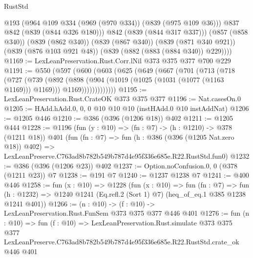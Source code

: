 \begin{lexlean}{RustStd}
\begin{coremodule}
            @193
            (@964 @109 @334 (@969 (@970 @334)) (@839 (@975 @109 @36)))
            @837
            @842
            (@839 (@844 @326 @180)))
          @842
          (@839 (@844 @317 @337)))
        (@857 (@858 @340))
        (@839 (@862 @340))
        (@839 (@867 @340))
        (@839 (@871 @340 @921))
        (@839 (@876 @103 @921 @48))
        (@839 (@882 (@883 (@884 @340)) @229))))
@1169 := LexLeanPreservation.Rust.Corr.lNil @373 @375 @377 @700 @229
@1191 := @550
    (@597
      (@600
        (@603
          (@625
            (@649
              (@667
                (@701
                  (@713
                    (@718
                      (@727
                        (@739
                          (@892
                            (@898
                              (@904 (@1019 (@1025 (@1031 (@1077 (@1163 @1169))) @1169)))
                              @1169)))))))))))))
@1195 := LexLeanPreservation.Rust.CrateOK @373 @375 @377
@1196 := Nat.casesOn.{0}
@1205 := HAdd.hAdd.{0, 0, 0} @10 @10 @10 (instHAdd.{0} @10 instAddNat)
@1206 := @1205 @446
@1210 := @386 (@396 (@1206 @18)) @402
@1211 := @1205 @444
@1228 := @1196
    (fun (y : @10) => (fn : @7) -> (h : @1210) -> @378 (@1211 @18))
    @401
    (fun (fn : @7) =>
    fun (h : @386 (@396 (@1205 Nat.zero @18)) @402) =>
    LexLeanPreserve.C763ad8b782b549b787d4e95f336e685e.R22.RustStd.fun0)
@1232 := @386 (@396 (@1206 @23)) @402
@1237 := Option.noConfusion.{0, 0} (@378 (@1211 @23)) @7
@1238 := @191 @7
@1240 := @1237 @1238 @7
@1241 := @400 @446
@1258 := fun (x : @10) =>
  @1228
    (fun (x : @10) =>
    fun (fn : @7) =>
    fun (h : @1232) => @1240 @1241 (Eq.refl.{2} (Sort 1) @7) (heq_of_eq.{1} @385 @1238 @1241 @401))
@1266 := (n : @10) -> (f : @10) -> LexLeanPreservation.Rust.FunSem @373 @375 @377 @446 @401
@1276 := fun (n : @10) =>
  fun (f : @10) =>
  LexLeanPreservation.Rust.simulate
    @373
    @375
    @377
    LexLeanPreserve.C763ad8b782b549b787d4e95f336e685e.R22.RustStd.crate_ok
    @446
    @401
\end{coremodule}
\end{lexlean}
